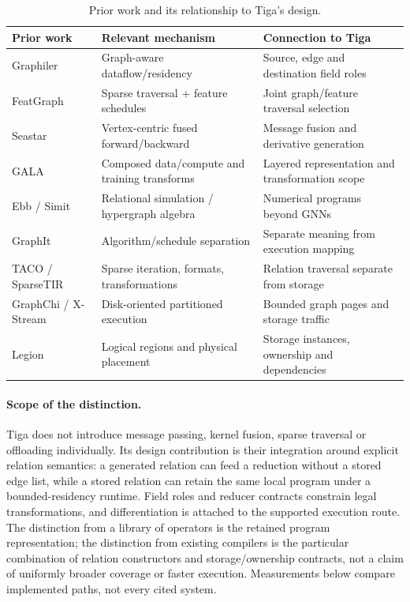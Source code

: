 \begin{table}[ht]
\centering\small
\begin{tabularx}{\linewidth}{l Y Y}
\toprule
Prior work & Relevant mechanism & Connection to Tiga \\
\midrule
Graphiler~\cite{graphiler} & Graph-aware dataflow/residency & Source, edge and destination field roles \\
FeatGraph~\cite{featgraph} & Sparse traversal + feature schedules & Joint graph/feature traversal selection \\
Seastar~\cite{seastar} & Vertex-centric fused forward/backward & Message fusion and derivative generation \\
GALA~\cite{gala} & Composed data/compute and training transforms & Layered representation and transformation scope \\
Ebb / Simit~\cite{ebb,simit} & Relational simulation / hypergraph algebra & Numerical programs beyond GNNs \\
GraphIt~\cite{graphit} & Algorithm/schedule separation & Separate meaning from execution mapping \\
TACO / SparseTIR~\cite{taco,sparsetir} & Sparse iteration, formats, transformations & Relation traversal separate from storage \\
GraphChi / X-Stream~\cite{graphchi,xstream} & Disk-oriented partitioned execution & Bounded graph pages and storage traffic \\
Legion~\cite{legion} & Logical regions and physical placement & Storage instances, ownership and dependencies \\
\bottomrule
\end{tabularx}
\caption{Prior work and its relationship to Tiga's design.}
\end{table}
\paragraph{Scope of the distinction.}
Tiga does not introduce message passing, kernel fusion, sparse traversal or
offloading individually. Its design contribution is their integration around
explicit relation semantics: a generated relation can feed a reduction without
a stored edge list, while a stored relation can retain the same local program
under a bounded-residency runtime. Field roles and reducer contracts constrain
legal transformations, and differentiation is attached to the supported
execution route. The distinction from a library of operators is the retained
program representation; the distinction from existing compilers is the
particular combination of relation constructors and storage/ownership contracts,
not a claim of uniformly broader coverage or faster execution. Measurements
below compare implemented paths, not every cited system.
\FloatBarrier
